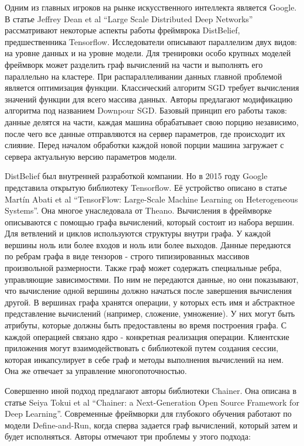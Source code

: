 \par
Одним из главных игроков на рынке искусственного интеллекта является Google. В статье Jeffrey Dean et al “Large Scale Distributed Deep Networks”\cite{lsd} рассматривают некоторые аспекты работы фреймврока DistBelief, предшественника Tensorflow. Исследователи описывают параллелизм двух видов: на уровне данных и на уровне модели. Для тренировки особо крупных моделей фреймворк может разделить граф вычислений на части и выполнять его параллельно на кластере. При распараллеливании данных главной проблемой является оптимизация функции. Классический алгоритм SGD требует вычисления значений функции для всего массива данных. Авторы предлагают модификацию алгоритма под названием Downpour SGD. Базовый принцип его работы таков: данные делятся на части, каждая машина обрабатывает свою порцию независимо, после чего все данные отправляются на сервер параметров, где происходит их слияние. Перед началом обработки каждой новой порции машина загружает с сервера актуальную версию параметров модели.
\par
DistBelief был внутренней разработкой компании. Но в 2015 году Google представила открытую библиотеку Tensorflow. Её устройство описано в статье Martín Abati et al “TensorFlow: Large-Scale Machine Learning on Heterogeneous Systems”\cite{tf}. Она многое унаследовала от Theano. Вычисления в фреймворке описываются с помощью графа вычислений, который состоит из набора вершин. Для ветвлений и циклов используются структуры внутри графа. У каждой вершины ноль или более входов и ноль или более выходов. Данные передаются по ребрам графа в виде тензоров - строго типизированных массивов произвольной размерности. Также граф может содержать специальные ребра, управляющие зависимостями. По ним не передаются данные, но они показывают, что вычисление одной вершины должно начаться после завершения вычисления другой. В вершинах графа хранятся операции, у которых есть имя и абстрактное представление вычислений (например, сложение, умножение). У них могут быть атрибуты, которые должны быть предоставлены во время построения графа. С каждой операцией связано ядро - конкретная реализация операции. Клиентские приложения могут взаимодействовать с библиотекой путем создания сессии, которая инкапсулирует в себе граф и методы выполнения вычислений на нем. Она же отвечает за управление многопоточностью.
\par
Совершенно иной подход предлагают авторы библиотеки Chainer. Она описана в статье Seiya Tokui et al “Chainer: a Next-Generation Open Source Framework for Deep Learning”\cite{chainer}. Современные фреймворки для глубокого обучения работают по модели Define-and-Run, когда сперва задается граф вычислений, который затем и будет исполняться. Авторы отмечают три проблемы у этого подхода:
